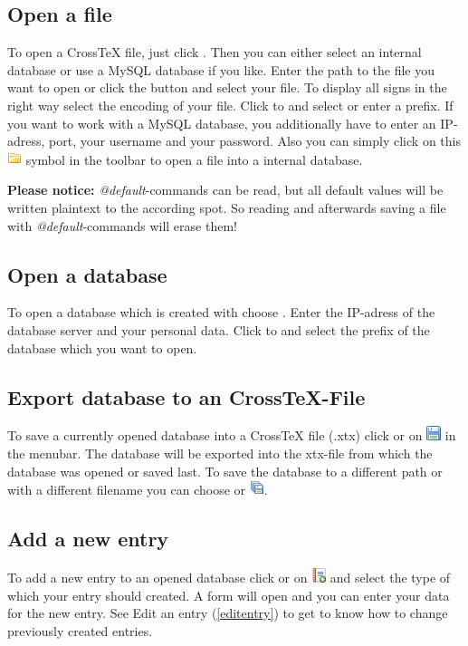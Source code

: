 \documentclass[a4paper,10pt]{scrartcl}
\begin{document}
\subsection{Open a file}
To open a CrossTeX file, just click \clickpath{\file}{\openfile}.
Then you can either select an internal database or use a MySQL database if you
like. Enter the path to the file you want to open or click the \browse button
and select your file. To display all signs in the right way select the encoding
of your file. Click to \connectdb and select or enter a prefix. If you want to
work with a MySQL database, you additionally have to enter an IP-adress, port,
your username and your password.
Also you can simply click on this \includegraphics{./images/folder.png}
 symbol in the toolbar to open a file into a internal database.
 
\textbf{Please notice:} \textit{@default}-commands can be read, but all default
values will be written plaintext to the according spot. So reading and
afterwards saving a file with \textit{@default}-commands will erase them!
\subsection{Open a database}
To open a database which is created with \crossrefx choose
\clickpath{\file}{\openfile}. Enter the IP-adress of the database server and
your personal data. Click to \connectdb and select the prefix of the database
which you want to open.
\subsection{Export database to an CrossTeX-File}
To save a currently opened database into a CrossTeX file (.xtx) click
\clickpath{\file}{\exportdatabase} or on \includegraphics{./images/disk.png}
in the menubar. The database will be exported into the xtx-file from which the
database was opened or saved last. To save the database to a different path or
with a different filename you can choose \clickpath{\file}{\exportdatabaseas} or
\includegraphics{./images/disk_multiple.png}.
\subsection{Add a new entry}
To add a new entry to an opened database click \clickpath{\edit}{\newentry} or
on \includegraphics{./images/report_add.png} and select the type of which
your entry should created. A form will open and you can enter your data for the
new entry.
See Edit an entry (\ref{editentry}) to get to know how to change previously
created entries.
\end{document}
